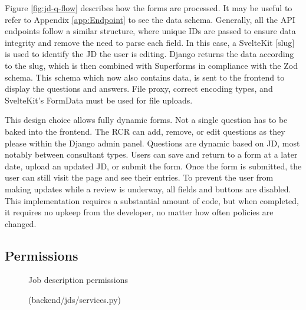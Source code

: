 Figure \ref{fig:jd-q-flow} describes how the forms are processed. It may be useful to refer to Appendix \ref{app:Endpoint} to see the data schema. Generally, all the API endpoints follow a similar structure, where unique IDs are passed to ensure data integrity and remove the need to parse each field. In this case, a SvelteKit $[$slug$]$ is used to identify the JD the user is editing. Django returns the data according to the slug, which is then combined with Superforms in compliance with the Zod schema. This schema which now also contains data, is sent to the frontend to display the questions and answers. File proxy, correct encoding types, and SvelteKit's FormData must be used for file uploads.

This design choice allows fully dynamic forms. Not a single question has to be baked into the frontend. The RCR can add, remove, or edit questions as they please within the Django admin panel. Questions are dynamic based on JD, most notably between consultant types. Users can save and return to a form at a later date, upload an updated JD, or submit the form. Once the form is submitted, the user can still visit the page and see their entries. To prevent the user from making updates while a review is underway, all fields and buttons are disabled. This implementation requires a substantial amount of code, but when completed, it requires no upkeep from the developer, no matter how often policies are changed.

\subsection{Permissions}
\begin{figure}[h]
\centering
{}
\vspace{-5pt}
\caption{Job description permissions}
\vspace{-10pt}
\caption*{(backend/jds/services.py)}
\label{fig:jd-perms}
\vspace{-5pt}
\end{figure}

